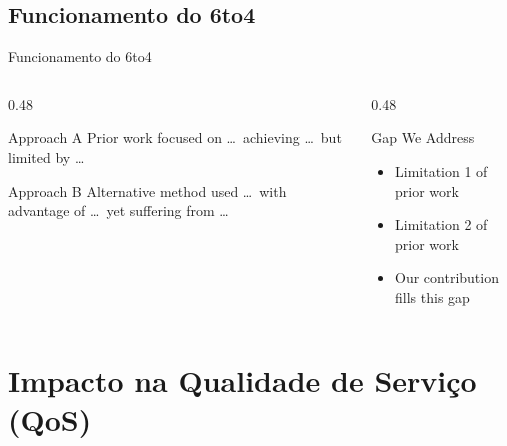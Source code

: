 \documentclass[aspectratio=169]{beamer}
\begin{document}
\begin{frame}
    
\section{Funcionamento do 6to4}
{Funcionamento do 6to4}
  \begin{columns}[T]
    \begin{column}{0.48\textwidth}
      \begin{block}{Approach A}
        Prior work focused on \ldots\ achieving \ldots\ but limited by \ldots
      \end{block}
      \vspace{0.5em}
      \begin{block}{Approach B}
        Alternative method used \ldots\ with advantage of \ldots\ yet suffering from \ldots
      \end{block}
    \end{column}
    \begin{column}{0.48\textwidth}
      \begin{block}{Gap We Address}
        \begin{itemize}
          \item Limitation 1 of prior work
          \item Limitation 2 of prior work
          \item Our contribution fills this gap
        \end{itemize}
      \end{block}
    \end{column}
  \end{columns}
\end{frame}

\section{Impacto na Qualidade de Serviço (QoS)}
\end{document}
